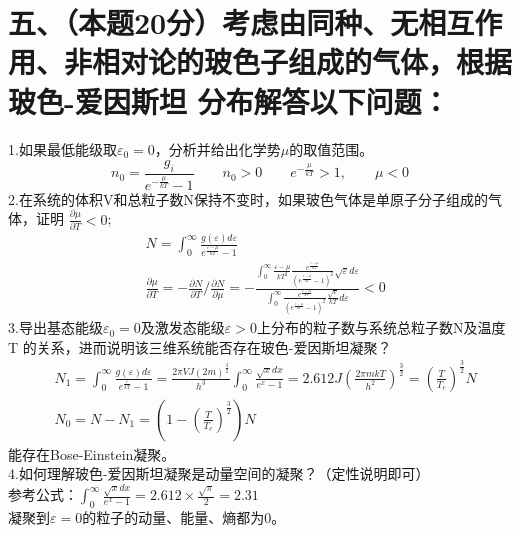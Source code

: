 \documentclass[UTF8]{ctexart}
\begin{document}
\section*{五、（本题20分）考虑由同种、无相互作用、非相对论的玻色子组成的气体，根据玻色-爱因斯坦
  分布解答以下问题：}
1.如果最低能级取$\varepsilon_0=0$，分析并给出化学势$\mu$的取值范围。
\begin{equation*}
  n_0=\frac{g_i}{e^{-\frac{\mu}{kT}}-1}\quad\quad
  n_0>0\quad\quad e^{-\frac{\mu}{kT}}>1,\quad\quad \mu<0
\end{equation*}
2.在系统的体积V和总粒子数N保持不变时，如果玻色气体是单原子分子组成的气体，证明
$\frac{\partial\mu}{\partial T}<0$;
\begin{equation*}
  \begin{aligned}
     & N=\int_0^\infty \frac{g(\varepsilon)d\varepsilon}{e^{\frac{\varepsilon-\mu}{kT}}-1}          \\
     & \frac{\partial\mu}{\partial T}=-\frac{\partial N}{\partial T}/\frac{\partial N}{\partial\mu}
    =-\frac{\int_0^\infty \frac{\varepsilon-\mu}{kT^2}
      \frac{e^\frac{\varepsilon-\mu}{kT}}{(e^\frac{\varepsilon-\mu}{kT}-1)^2}
      \sqrt{\varepsilon}d\varepsilon}
    {\int_0^\infty\frac{e^\frac{\varepsilon-\mu}{kT}}{(e^\frac{\varepsilon-\mu}{kT}-1)^2}
      \frac{\sqrt{\varepsilon}}{kT}d\varepsilon}<0
  \end{aligned}
\end{equation*}
3.导出基态能级$\varepsilon_0=0$及激发态能级$\varepsilon>0$上分布的粒子数与系统总粒子数N及温度T
的关系，进而说明该三维系统能否存在玻色-爱因斯坦凝聚？
\begin{equation*}
  \begin{aligned}
     & N_1=\int_0^\infty\frac{g(\varepsilon)d\varepsilon}{e^\frac{\varepsilon}{kT}-1}
    =\frac{2\pi VJ(2m)^\frac{3}{2}}{h^3}\int_0^\infty\frac{\sqrt{x}dx}{e^x-1}
    =2.612J(\frac{2\pi mkT}{h^2})^\frac{3}{2}=(\frac{T}{T_c})^\frac{3}{2}N            \\
     & N_0=N-N_1=(1-(\frac{T}{T_c})^\frac{3}{2})N
  \end{aligned}
\end{equation*}
能存在Bose-Einstein凝聚。\\
4.如何理解玻色-爱因斯坦凝聚是动量空间的凝聚？（定性说明即可）\\
参考公式：$\int_0^\infty\frac{\sqrt{x}dx}{e^x-1}=2.612\times\frac{\sqrt{\pi}}{2}=2.31$\\
凝聚到$\varepsilon=0$的粒子的动量、能量、熵都为0。
\end{document}
